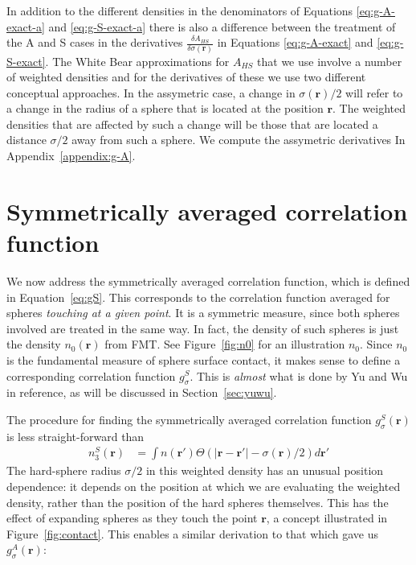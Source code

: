 \documentclass[letterpaper,twocolumn,amsmath,amssymb,jcp,10pt,aip]{revtex4-1}
\newcommand{\rr}{\textbf{r}}
\newcommand{\derivation}[1]{} %
\begin{document}
In addition to the different densities in the denominators of Equations 
\ref{eq:g-A-exact-a} and \ref{eq:g-S-exact-a} there is also a difference 
between the treatment of the A and S cases in the derivatives 
$\frac{\delta A_{HS}}{\delta \sigma(\mathbf{r})}$ in Equations \ref{eq:g-A-exact} 
and \ref{eq:g-S-exact}. The White Bear approximations for $A_{HS}$ 
that we use involve a number of weighted densities and for the derivatives 
of these we use two different conceptual approaches.  In the assymetric case, 
a change in $\sigma(\mathbf{r})/2$ will refer to a change in the radius of a sphere 
that is located at the position $\mathbf{r}$.  The weighted densities that are 
affected by such a change will be those that are located a distance $\sigma/2$ away 
from such a sphere.  We compute the assymetric derivatives In Appendix~\ref{appendix:g-A}.     

\derivation{
  \end{widetext}
}

\section{Symmetrically averaged correlation function}\label{sec:g-S}

We now address the symmetrically averaged correlation function, which
is defined in Equation~\ref{eq:gS}.  This corresponds to the
correlation function averaged for
spheres \emph{touching at a given point}.  It is a symmetric
measure, since both spheres involved are treated in the same way.  In
fact, the density of such spheres is just the density $n_0(\rr)$ from
FMT.  See Figure~\ref{fig:n0} for an illustration $n_0$.  Since $n_0$
is the fundamental measure of sphere surface contact, it makes sense
to define a corresponding correlation function $g_\sigma^S$.  This is
\emph{almost} what is done by Yu and  Wu in
reference\cite{yu2002fmt-dft-inhomogeneous-associating}, as will be
discussed in Section~\ref{sec:yuwu}.

The procedure for finding the symmetrically averaged correlation
function $g_\sigma^S(\rr)$ is less straight-forward than 
\begin{align}
  n_3^S(\rr) &= \int n(\rr')\Theta(|\rr-\rr'|-\sigma(\rr)/2)d\rr'
\end{align}
The hard-sphere radius $\sigma/2$ in this weighted density has an unusual
position dependence:  it depends on the position at which we are
evaluating the weighted density, rather than the position of the hard
spheres themselves.  This has the effect of expanding spheres as they
touch the point $\rr$, a concept illustrated in
Figure~\ref{fig:contact}.  This enables a similar derivation to that
which gave us $g_\sigma^A(\rr)$:
\end{document}
